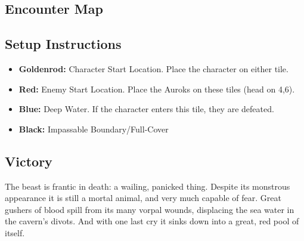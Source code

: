 \pagebreak

\subsection*{Encounter Map}
\begin{center}
\end{center}

\subsection*{Setup Instructions}
\begin{itemize}
\item \textbf{Goldenrod:} Character Start Location. Place the character on either tile.
\item \textbf{Red:} Enemy Start Location. Place the Auroks on these tiles (head on 4,6).
\item \textbf{Blue:} Deep Water. If the character enters this tile, they are defeated.
\item \textbf{Black:} Impassable Boundary/Full-Cover
\end{itemize}

\pagebreak

\subsection*{Victory}
The beast is frantic in death: a wailing, panicked thing. Despite its monstrous appearance it is still a mortal animal, and very much capable of fear. Great gushers of blood spill from its many vorpal wounds, displacing the sea water in the cavern's divots. And with one last cry it sinks down into a great, red pool of itself.\\

